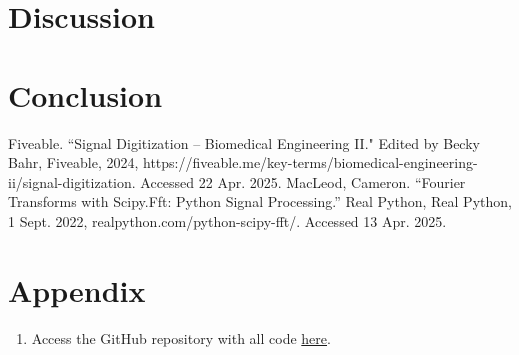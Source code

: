 \documentclass{article}
\begin{document}
\section{Discussion}


\section{Conclusion}

\begin{thebibliography}{9}
     Fiveable. ``Signal Digitization – Biomedical Engineering II." Edited by Becky Bahr, Fiveable, 2024, https://fiveable.me/key-terms/biomedical-engineering-ii/signal-digitization. Accessed 22 Apr. 2025.
     MacLeod, Cameron. “Fourier Transforms with Scipy.Fft: Python Signal Processing.” Real Python, Real Python, 1 Sept. 2022, realpython.com/python-scipy-fft/. Accessed 13 Apr. 2025. 
\end{thebibliography}

\section{Appendix}
\begin{enumerate}
    \item Access the GitHub repository with all code \href{https://github.com/margheritatonon/approximation-II-assignment}{here}.
\end{enumerate}
\end{document}
